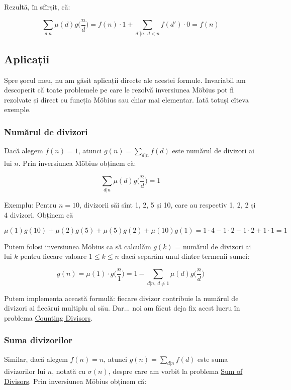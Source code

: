 \documentclass[../main.tex]{subfiles}
\begin{document}
Rezultă, în sfîrșit, că:

$$\sum_{d|n} \mu(d) g\Big(\frac{n}{d}\Big) = f(n) \cdot 1 + \sum_{d'|n,\ d < n} f(d') \cdot 0 = f(n)$$

\subsection{Aplicații}

Spre șocul meu, nu am găsit aplicații directe ale acestei formule. Invariabil am descoperit că toate problemele pe care le rezolvă inversiunea Möbius pot fi rezolvate și direct cu funcția Möbius sau chiar mai elementar. Iată totuși cîteva exemple.

\subsubsection*{Numărul de divizori}

Dacă alegem $f(n) = 1$, atunci $g(n) = \sum_{d|n} f(d)$ este numărul de divizori ai lui $n$. Prin inversiunea Möbius obținem că:

$$\sum_{d|n} \mu(d) g\Big(\frac{n}{d}\Big) = 1$$

Exemplu: Pentru $n = 10$, divizorii săi sînt 1, 2, 5 și 10, care au respectiv 1, 2, 2 și 4 divizori. Obținem că

$$\mu(1) g(10) + \mu(2) g(5) + \mu(5) g(2) + \mu(10) g(1) = 1 \cdot 4 - 1 \cdot 2 - 1 \cdot 2 + 1 \cdot 1 = 1$$

Putem folosi inversiunea Möbius ca să calculăm $g(k)$ = numărul de divizori ai lui $k$ pentru fiecare valoare $1 \leq k \leq n$ dacă separăm unul dintre termenii sumei:

$$g(n) = \mu(1) \cdot g\Big(\frac{n}{1}\Big) = 1 - \sum_{d|n,\ d \neq 1} \mu(d) g\Big(\frac{n}{d}\Big)$$

Putem implementa această formulă: fiecare divizor contribuie la numărul de divizori ai fiecărui multiplu al său. Dar... noi am făcut deja fix acest lucru în problema \hyperref[problem:counting-divisors]{Counting Divisors}.

\subsubsection*{Suma divizorilor}

Similar, dacă alegem $f(n) = n$, atunci $g(n) = \sum_{d|n} f(d)$ este suma divizorilor lui $n$, notată cu $\sigma(n)$, despre care am vorbit la problema \hyperref[problem:sum-of-divisors]{Sum of Divisors}. Prin inversiunea Möbius obținem că:
\end{document}
